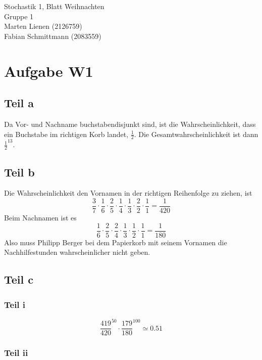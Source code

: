 \documentclass[10pt,a4paper]{article}
\begin{document}
Stochastik 1, Blatt Weihnachten\\
Gruppe 1\\
Marten Lienen (2126759)\\
Fabian Schmittmann (2083559)

\section{Aufgabe W1}

\subsection{Teil a}
Da Vor- und Nachname buchstabendisjunkt sind, ist die Wahrscheinlichkeit, dass ein Buchstabe im richtigen Korb landet, $\frac{1}{2}$.
Die Gesamtwahrscheinlichkeit ist dann $\frac{1}{2}^{13}$.

\subsection{Teil b}
Die Wahrscheinlichkeit den Vornamen in der richtigen Reihenfolge zu ziehen, ist
\begin{equation}
  \frac{3}{7} \cdot \frac{1}{6} \cdot \frac{2}{5} \cdot \frac{1}{4} \cdot \frac{1}{3} \cdot \frac{2}{2} \cdot \frac{1}{1} = \frac{1}{420}
\end{equation}
Beim Nachnamen ist es
\begin{equation}
  \frac{1}{6} \cdot \frac{2}{5} \cdot \frac{2}{4} \cdot \frac{1}{3} \cdot \frac{1}{2} \cdot \frac{1}{1} = \frac{1}{180}
\end{equation}
Also muss Philipp Berger bei dem Papierkorb mit seinem Vornamen die Nachhilfestunden wahrscheinlicher nicht geben.

\subsection{Teil c}

\subsubsection{Teil i}

\begin{equation}
  \frac{419}{420}^{50} \cdot \frac{179}{180}^{100} \simeq 0.51
\end{equation}

\subsubsection{Teil ii}
\end{document}
